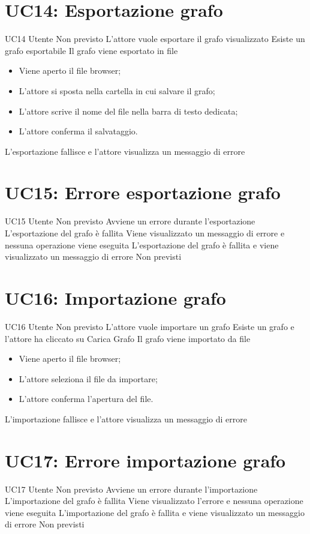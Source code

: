 \documentclass[../AnalisideiRequisiti.tex]{subfiles}
\begin{document}
\section{UC14: Esportazione grafo}
\UserCase
{UC14}
{Utente}
{Non previsto}
{L'attore vuole esportare il grafo visualizzato}
{Esiste un grafo esportabile}
{Il grafo viene esportato in file}
{
	\begin{itemize}
			\item{} Viene aperto il file browser;
			\item{} L'attore si sposta nella cartella in cui salvare il grafo;
			\item{} L'attore scrive il nome del file nella barra di testo dedicata;
			\item{} L'attore conferma il salvataggio.
	\end{itemize}
}
{L'esportazione fallisce e l'attore visualizza un messaggio di errore }

\section{UC15: Errore esportazione grafo}
\UserCase
{UC15}
{Utente}
{Non previsto}
{Avviene un errore durante l'esportazione}
{L'esportazione del grafo è fallita}
{Viene visualizzato un messaggio di errore e nessuna operazione viene eseguita}
{L'esportazione del grafo è fallita e viene visualizzato un messaggio di errore}
{Non previsti}

\section{UC16: Importazione grafo}

\UserCase
{UC16}
{Utente}
{Non previsto}
{L'attore vuole importare un grafo}
{Esiste un grafo e l'attore ha cliccato su Carica Grafo}
{Il grafo viene importato da file}
{
	\begin{itemize}
			\item{} Viene aperto il file browser;
			\item{} L'attore seleziona il file da importare;
			\item{} L'attore conferma l'apertura del file.
	\end{itemize}
}
{L'importazione fallisce e l'attore visualizza un messaggio di errore }

\section{UC17: Errore importazione grafo}
\UserCase
{UC17}
{Utente}
{Non previsto}
{Avviene un errore durante l'importazione}
{L'importazione del grafo è fallita}
{Viene visualizzato l'errore e nessuna operazione viene eseguita}
{L'importazione del grafo è fallita e viene visualizzato un messaggio di errore}
{Non previsti}
\end{document}
